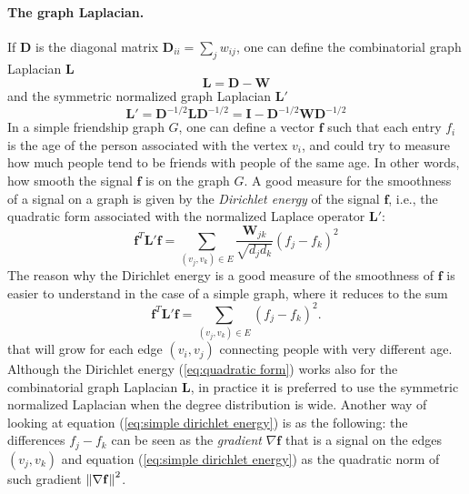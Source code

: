 \paragraph{The graph Laplacian.}
If $\mathbf D$ is the diagonal matrix $\mathbf D_{ii} = \sum_j w_{ij}$, one can define \cite{Vandergheynst} the combinatorial graph Laplacian $\mathbf L$
\begin{equation}\label{eq:graph Laplacian}
		\mathbf L = \mathbf D-\mathbf W
\end{equation}
 and the symmetric normalized graph Laplacian $\mathbf L'$
\begin{equation}\label{eq:normalized graph Laplacian}
\mathbf L' =  \mathbf D^{-1/2}\mathbf L\mathbf D^{-1/2} = \mathbf I - \mathbf D^{-1/2}\mathbf W\mathbf D^{-1/2}
\end{equation}
In a simple friendship graph $G$, one can define a vector $\mathbf f$ such that each entry $ f_i$ is the age of the person associated with the vertex $v_i$, and could try to measure how much people tend to be friends with people of the same age. In other words, how smooth the signal $\mathbf f$ is on the graph $G$. A good measure for the smoothness of a signal on a graph is given by the \textit{Dirichlet energy} of the signal $\mathbf f$, i.e., the quadratic form associated with the normalized Laplace operator $\mathbf L'$:
\begin{equation}\label{eq:quadratic form}
	\mathbf f^T \mathbf L' \mathbf f = \sum_{\left(v_{j}, v_{k}\right) \in {E}} \frac{\boldsymbol{W}_{j k}}{\sqrt{d_{j} {d}_{k}}}\left({f}_{j}-{f}_{k}\right)^{2}
\end{equation}
The reason why the Dirichlet energy is a good measure of the smoothness of $\mathbf f$ is easier to understand in the case of a simple graph, where it reduces to the sum
\begin{equation}\label{eq:simple dirichlet energy}
	\mathbf f^T \mathbf L' \mathbf f = \sum_{\left(v_{j}, v_{k}\right) \in {E}} \left({f}_{j}-{f}_{k}\right)^{2}.
\end{equation}
 that will grow for each edge $(v_i, v_j)$ connecting people with very different age. Although the Dirichlet energy (\ref{eq:quadratic form}) works also for the combinatorial graph Laplacian $\mathbf L$, in practice it is preferred to use the symmetric normalized Laplacian when the degree distribution is wide. Another way of looking at equation (\ref{eq:simple dirichlet energy}) is as the following: the differences ${f}_j-{f}_k$ can be seen as the \textit{gradient} $\nabla \mathbf{f}$ that is a signal on the edges $(v_j, v_k)$ and equation (\ref{eq:simple dirichlet energy}) as the quadratic norm of such gradient $\left\lVert\nabla \mathbf{f}\right\rVert^2$.
